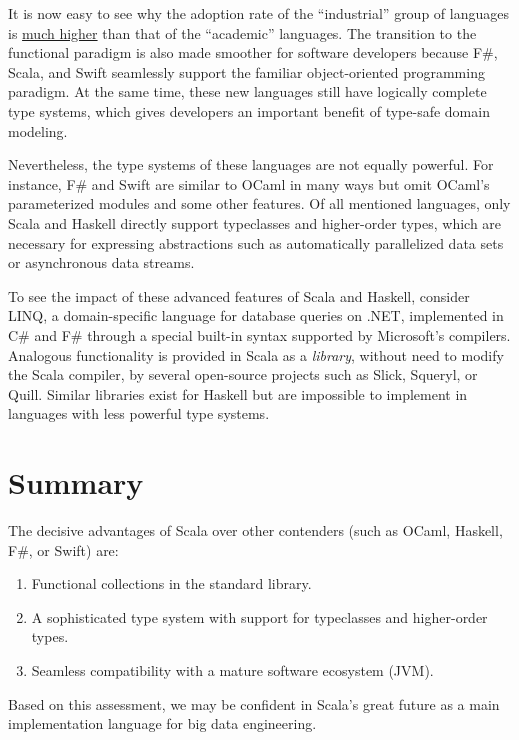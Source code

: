 It is now easy to see why the adoption rate of the ``industrial''
group of languages is \href{https://www.tiobe.com/tiobe-index/}{much higher}
than that of the ``academic'' languages. The transition to the functional
paradigm is also made smoother for software developers because F\#,
Scala, and Swift seamlessly support the familiar object-oriented programming
paradigm. At the same time, these new languages still have logically
complete type systems, which gives developers an important benefit
of type-safe domain modeling.

Nevertheless, the type systems of these languages are not equally
powerful. For instance, F\# and Swift are similar to OCaml in many
ways but omit OCaml's parameterized modules and some other features.
Of all mentioned languages, only Scala and Haskell directly support
typeclasses and higher-order types, which are necessary for expressing
abstractions such as automatically parallelized data sets or asynchronous
data streams.

To see the impact of these advanced features of Scala and Haskell,
consider LINQ, a domain-specific language for database queries on
.NET, implemented in C\# and F\# through a special built-in syntax
supported by Microsoft's compilers. Analogous functionality is provided
in Scala as a \emph{library}, without need to modify the Scala compiler,
by several open-source projects such as Slick, Squeryl, or Quill.
Similar libraries exist for Haskell \textendash{} but are impossible
to implement in languages with less powerful type systems.

\section{Summary}

The decisive advantages of Scala over other contenders (such as OCaml,
Haskell, F\#, or Swift) are:
\begin{enumerate}
\item Functional collections in the standard library.
\item A sophisticated type system with support for typeclasses and higher-order
types.
\item Seamless compatibility with a mature software ecosystem (JVM).
\end{enumerate}
Based on this assessment, we may be confident in Scala's great future
as a main implementation language for big data engineering. 
